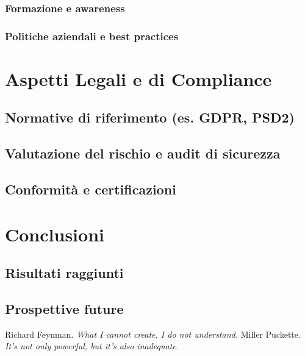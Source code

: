 \documentclass[a4paper,12pt]{book}
\begin{document}
\subsection{Formazione e awareness}
\subsection{Politiche aziendali e best practices}

\chapter{Aspetti Legali e di Compliance}
\section{Normative di riferimento (es. GDPR, PSD2)}
\section{Valutazione del rischio e audit di sicurezza}
\section{Conformità e certificazioni}

\chapter{Conclusioni}
\section{Risultati raggiunti}
\section{Prospettive future}


\begin{thebibliography}{9}
 Richard Feynman. \textit{What I cannot create, I do not understand.}
 Miller Puckette. \textit{It’s not only powerful, but it’s also inadequate.}
\end{thebibliography}
\end{document}
